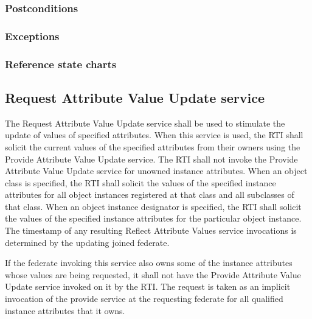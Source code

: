 \begin{compactstdpage}

    \subsubsection{Postconditions}



    \subsubsection{Exceptions}



    \subsubsection{Reference state charts}



    \subsection{Request Attribute Value Update service}


    The Request Attribute Value Update service shall be used to stimulate the update of values of specified attributes. When this service is used, the RTI shall solicit the current values of the specified attributes from their owners using the Provide Attribute Value Update \rtiinitiated{} service. The RTI shall not invoke the Provide Attribute Value Update \rtiinitiated{} service for unowned instance attributes. When an object class is specified, the RTI shall solicit the values of the specified instance attributes for all object instances registered at that class and all subclasses of that class. When an object instance designator is specified, the RTI shall solicit the values of the specified instance attributes for the particular object instance. The timestamp of any resulting Reflect Attribute Values \rtiinitiated{} service invocations is determined by the updating joined federate.


    If the federate invoking this service also owns some of the instance attributes whose values are being requested, it shall not have the Provide Attribute Value Update \rtiinitiated{} service invoked on it by the RTI. The request is taken as an implicit invocation of the provide service at the requesting federate for all qualified instance attributes that it owns.



\end{compactstdpage}
